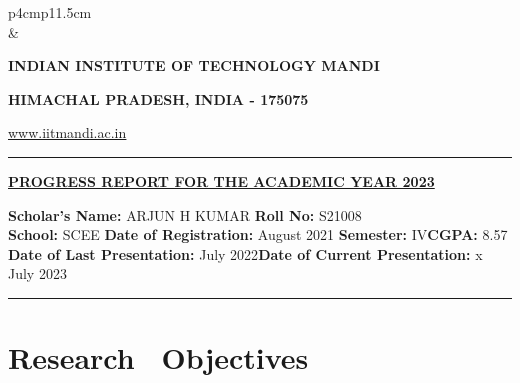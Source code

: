 \documentclass[12 pt, a4paper]{article}
\newcommand{\HRule}{\rule{\linewidth}{1mm}}
\begin{document}
    \pagestyle{empty}
\vskip 0.2cm
	\begin{tabular}{p{4cm}p{11.5cm}}
		  \\
		& \centering \large\bf\phantom{Empty line}\\ 
		\rule{0pt}{1pt} \centering \large\bf{INDIAN INSTITUTE OF TECHNOLOGY MANDI} \\
		\rule{0pt}{1pt} \centering \large\bf{HIMACHAL PRADESH, INDIA - 175075} \\
		\rule{0pt}{1pt} \centering \underline{\href{www.iitmandi.ac.in}{www.iitmandi.ac.in}}\\
	\end{tabular}
\noindent

{\raggedleft{}\HRule}
 
\begin{center}
\large\bf\underline{PROGRESS REPORT FOR THE ACADEMIC YEAR 2023}
\end{center}
\indent \textbf{Scholar's Name:} {ARJUN H KUMAR} \hfill \textbf{Roll No:} {S21008} \\
\noindent \textbf{School:} {SCEE} \hfill \textbf{Date of Registration: }{ August 2021} \newline
\noindent \textbf{Semester:} {IV}\hfill \textbf{CGPA: }{8.57}
\newline
\noindent \textbf{Date of Last Presentation: }{ July 2022}\hfill \textbf{Date of Current Presentation: }{x July 2023}
\\
\noindent\rule{17.69cm}{0.8pt}
   
\section{Research ~Objectives}
    
\end{document}
